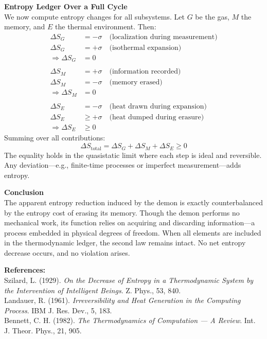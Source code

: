 \begin{technical}
\vspace{0.5em}
\noindent\textbf{Entropy Ledger Over a Full Cycle}\\[0.5em]
We now compute entropy changes for all subsystems. Let \( G \) be the gas, \( M \) the memory, and \( E \) the thermal environment. Then:
\begin{align*}
\Delta S_G &= -\sigma \quad \text{(localization during measurement)} \\
\Delta S_G &= +\sigma \quad \text{(isothermal expansion)} \\
\Rightarrow \Delta S_G &= 0 \\
\\[-1.5em]
\Delta S_M &= +\sigma \quad \text{(information recorded)} \\
\Delta S_M &= -\sigma \quad \text{(memory erased)} \\
\Rightarrow \Delta S_M &= 0 \\
\\[-1.5em]
\Delta S_E &= -\sigma \quad \text{(heat drawn during expansion)} \\
\Delta S_E &\geq +\sigma \quad \text{(heat dumped during erasure)} \\
\Rightarrow \Delta S_E &\geq 0
\end{align*}
Summing over all contributions:
\[
\Delta S_{\text{total}} = \Delta S_G + \Delta S_M + \Delta S_E \geq 0
\]
The equality holds in the quasistatic limit where each step is ideal and reversible. Any deviation—e.g., finite-time processes or imperfect measurement—adds entropy.

\vspace{0.5em}
\noindent\textbf{Conclusion}\\[0.5em]
The apparent entropy reduction induced by the demon is exactly counterbalanced by the entropy cost of erasing its memory. Though the demon performs no mechanical work, its function relies on acquiring and discarding information—a process embedded in physical degrees of freedom. When all elements are included in the thermodynamic ledger, the second law remains intact. No net entropy decrease occurs, and no violation arises.

\vspace{0.5em}
\noindent\textbf{References:}\\
Szilard, L. (1929). \textit{On the Decrease of Entropy in a Thermodynamic System by the Intervention of Intelligent Beings}. Z. Phys., 53, 840.\\
Landauer, R. (1961). \textit{Irreversibility and Heat Generation in the Computing Process}. IBM J. Res. Dev., 5, 183.\\
Bennett, C. H. (1982). \textit{The Thermodynamics of Computation — A Review}. Int. J. Theor. Phys., 21, 905.
\end{technical}
